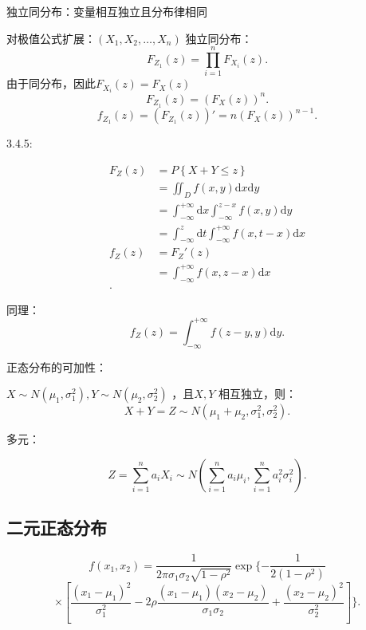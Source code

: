\begin{notation}
    独立同分布：变量相互独立且分布律相同
\end{notation}
对极值公式扩展：$\left( X_1,X_2,\ldots,X_n \right) $ 独立同分布：
\[
    F_{Z_1}\left( z \right)=\prod_{i=1}^{n} F_{X_i}\left( z \right)  
.\] 
由于同分布，因此$F_{X_i}\left( z \right) =F_{X}\left( z \right) $
\[
    F_{Z_1}\left( z \right)=(F_{X}\left( z \right) ) ^{n}
.\] 
\[
    f_{Z_1}\left( z \right) =\left( F_{Z_1}\left( z \right)  \right) '=n\left( F_{X}\left( z \right)  \right) ^{n-1}
.\] 
\begin{notation}
    3.4.5:

    \begin{align*}
        F_Z\left( z \right) &=P\left\{ X+Y\le z \right\} \\
        &= \iint_D f\left( x,y \right) \mathrm{d}x\mathrm{d}y \\
        &= \int_{-\infty}^{+\infty} \mathrm{d}x\int_{-\infty}^{z-x} f\left( x,y \right)  \mathrm{d}y \\
        &= \int_{-\infty}^{z} \mathrm{d}t \int_{-\infty}^{+\infty} f\left( x,t-x \right)   \mathrm{d}x \\
        f_Z\left( z \right) &= F_Z'\left( z \right)  \\
        &= \int_{-\infty}^{+\infty} f\left( x,z-x \right)  \mathrm{d}x \\
    .\end{align*}
\end{notation}
同理：\[
    f_Z\left( z \right) =\int_{-\infty}^{+\infty} f\left( z-y,y \right)  \mathrm{d}y
.\] 
\begin{notation}
    正态分布的可加性：

    $X\sim N\left( \mu_1,\sigma_1^2 \right) ,Y\sim N\left( \mu_2,\sigma_2^2 \right) $ ，且$X,Y$ 相互独立，则：\[
        X+Y=Z\sim N\left( \mu_1+\mu_2,\sigma_1^2,\sigma_2^2 \right) 
    .\] 

    多元：

    \[
        Z=\sum_{i=1}^{n} a_iX_i\sim N\left( \sum_{i=1}^{n} a_i\mu_i,\sum_{i=1}^{n} a_i^2\sigma_i^2 \right) 
    .\] 
\end{notation}
\subsection{二元正态分布}%
\label{sub:二元正态分布}
\[
    f( x_1,x_2 ) =\frac{1}{2\pi\sigma_1\sigma_2\sqrt{1-\rho^2} }\exp\{-\frac{1}{2( 1-\rho^2 )}
\] 
\[
     \times \left[ \frac{(x_1-\mu_1)^2}{\sigma_1^2}-2\rho \frac{( x_1-\mu_1 ) ( x_2-\mu_2 ) }{\sigma_1\sigma_2} +\frac{(x_2-\mu_2)^2}{\sigma_2^2}\right]\}
.\] 

